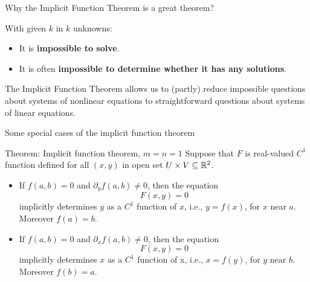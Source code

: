 \begin{frame}{Why the Implicit Function Theorem is a great theorem?}
    \begin{parchment}[Fact]
        With given $k$  in $k$ unknowns:
        \begin{itemize}
            \item It is \textbf{impossible to solve}.
            \item It is often \textbf{impossible to determine whether it has any solutions}.
        \end{itemize}
    \end{parchment}
    The Implicit Function Theorem allows us to (partly) reduce impossible questions about systems of nonlinear equations to straightforward questions about systems of linear equations. 
\end{frame}


\begin{frame}{Some special cases of the implicit function theorem}
    \begin{block}{Theorem: Implicit function theorem, $m=n=1$}
        Suppose that $F$ is real-valued $C^1$ function defined for all $(x, y)$ in open set $U\times V \subseteq \mathbb{R}^2$.
        \begin{itemize}
            \item If $f(a, b) = 0$ and $\partial_yf(a, b) \ne 0$, then the equation
            \begin{equation}
                F(x, y) = 0
            \end{equation}
            implicitly determines $y$ as a $C^1$ function of $x$, i.e., $y = f(x)$, for $x$ near $a$.  Moreover $f(a) = b$.
            \item If $f(a, b) = 0$ and $\partial_xf(a, b) \ne 0$, then the equation
            \begin{equation}
                F(x, y) = 0
            \end{equation}
            implicitly determines $x$ as a $C^1$ function of x, i.e., $x = f(y)$, for $y$ near $b$.  Moreover $f(b) = a$.
        \end{itemize}
    \end{block}
\end{frame}

